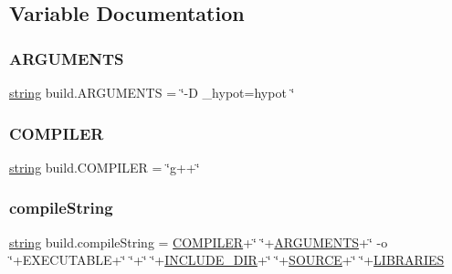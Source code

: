 \subsection{Variable Documentation}
\mbox{\label{namespacebuild_a22a020f532c8c3f6e670601012eef5eb}} 
\subsubsection{\texorpdfstring{ARGUMENTS}{ARGUMENTS}}
{\footnotesize\ttfamily \mbox{\hyperlink{asdl_8h_ae84541b4f3d8e1ea24ec0f466a8c568b}{string}} build.\+A\+R\+G\+U\+M\+E\+N\+TS = \char`\"{}-\/D \+\_\+hypot=hypot \char`\"{}}

\mbox{\label{namespacebuild_aa75f224fbf929d8e46d1d31968ee6451}} 
\subsubsection{\texorpdfstring{COMPILER}{COMPILER}}
{\footnotesize\ttfamily \mbox{\hyperlink{asdl_8h_ae84541b4f3d8e1ea24ec0f466a8c568b}{string}} build.\+C\+O\+M\+P\+I\+L\+ER = \char`\"{}g++\char`\"{}}

\mbox{\label{namespacebuild_aad7d648a6e7eb1f6b36140a180580b24}} 
\subsubsection{\texorpdfstring{compileString}{compileString}}
{\footnotesize\ttfamily \mbox{\hyperlink{asdl_8h_ae84541b4f3d8e1ea24ec0f466a8c568b}{string}} build.\+compile\+String = \mbox{\hyperlink{namespacebuild_aa75f224fbf929d8e46d1d31968ee6451}{C\+O\+M\+P\+I\+L\+ER}}+\char`\"{} \char`\"{}+\mbox{\hyperlink{namespacebuild_a22a020f532c8c3f6e670601012eef5eb}{A\+R\+G\+U\+M\+E\+N\+TS}}+\char`\"{} -\/o \char`\"{}+E\+X\+E\+C\+U\+T\+A\+B\+LE+\char`\"{} \char`\"{}+\char`\"{} \char`\"{}+\mbox{\hyperlink{namespacebuild_af7dbc41885851b81d2588a14a5523d92}{I\+N\+C\+L\+U\+D\+E\+\_\+\+D\+IR}}+\char`\"{} \char`\"{}+\mbox{\hyperlink{namespacebuild_a832e50b60ae1bc20032caf0540c2176b}{S\+O\+U\+R\+CE}}+\char`\"{} \char`\"{}+\mbox{\hyperlink{namespacebuild_ac41b6d1c6acdf4c0ab8bdc6f6c2eabda}{L\+I\+B\+R\+A\+R\+I\+ES}}}

